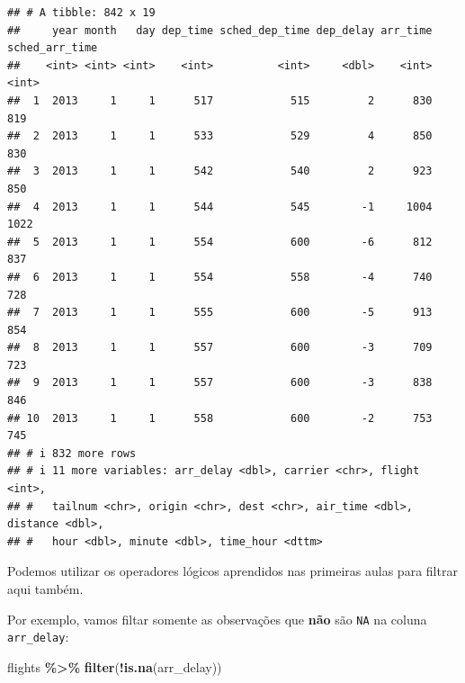 \documentclass[
]{book}
\newenvironment{Shaded}{\begin{snugshade}}{\end{snugshade}}
\newcommand{\FunctionTok}[1]{\textcolor[rgb]{0.13,0.29,0.53}{\textbf{#1}}}
\newcommand{\NormalTok}[1]{#1}
\newcommand{\SpecialCharTok}[1]{\textcolor[rgb]{0.81,0.36,0.00}{\textbf{#1}}}
\begin{document}
\begin{verbatim}
## # A tibble: 842 x 19
##     year month   day dep_time sched_dep_time dep_delay arr_time sched_arr_time
##    <int> <int> <int>    <int>          <int>     <dbl>    <int>          <int>
##  1  2013     1     1      517            515         2      830            819
##  2  2013     1     1      533            529         4      850            830
##  3  2013     1     1      542            540         2      923            850
##  4  2013     1     1      544            545        -1     1004           1022
##  5  2013     1     1      554            600        -6      812            837
##  6  2013     1     1      554            558        -4      740            728
##  7  2013     1     1      555            600        -5      913            854
##  8  2013     1     1      557            600        -3      709            723
##  9  2013     1     1      557            600        -3      838            846
## 10  2013     1     1      558            600        -2      753            745
## # i 832 more rows
## # i 11 more variables: arr_delay <dbl>, carrier <chr>, flight <int>,
## #   tailnum <chr>, origin <chr>, dest <chr>, air_time <dbl>, distance <dbl>,
## #   hour <dbl>, minute <dbl>, time_hour <dttm>
\end{verbatim}

\newpage

Podemos utilizar os operadores lógicos aprendidos nas primeiras aulas para filtrar aqui também.

Por exemplo, vamos filtar somente as observações que \textbf{não} são \texttt{NA} na coluna \texttt{arr\_delay}:

\begin{Shaded}
\begin{Highlighting}[]
\NormalTok{flights }\SpecialCharTok{\%\textgreater{}\%} \FunctionTok{filter}\NormalTok{(}\SpecialCharTok{!}\FunctionTok{is.na}\NormalTok{(arr\_delay))}
\end{Highlighting}
\end{Shaded}
\end{document}
